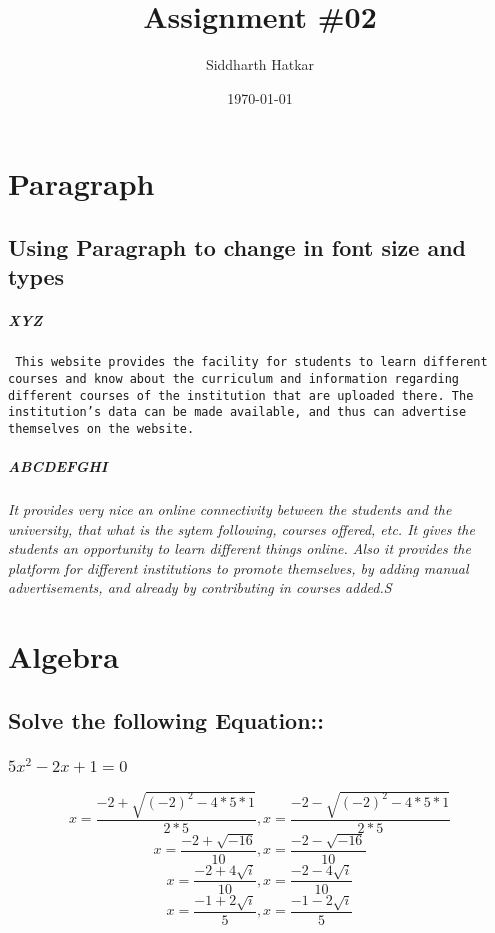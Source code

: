 \documentclass{report}
\title{Assignment \#02}
\date{\today}
\author{Siddharth Hatkar}
\begin{document}
	{\huge
	\maketitle
	}
	\newpage
	\tableofcontents
	\chapter{Paragraph}
	\section{\large{Using Paragraph to change in font size and types}}
	\paragraph{XYZ}
	\texttt{
		This website provides the facility for students to learn different courses and know about the curriculum and information regarding different courses of the institution that are uploaded there. The institution’s data can be made available, and thus can advertise themselves on the website.
	}
	\paragraph{ABCDEFGHI}
	\textit{\small
		 It provides very nice an online connectivity between the students and the university, that what is the sytem following, courses offered, etc. It gives the students an opportunity to learn different things online. Also it provides the platform for different institutions to promote themselves, by adding manual advertisements, and already by contributing in courses added.S
	}
	\newline
	\chapter{Algebra}
	\section{\large{Solve the following Equation:: }}
	\subsection{$5x^2 -2x+ 1 = 0$}
		
		$$x = \frac{-2+\sqrt{(-2)^2-4*5*1}}{2*5} , x = \frac{-2-\sqrt{(-2)^2-4*5*1}}{2*5}$$
		\newline \newline
		$$x = \frac{-2+\sqrt{-16}}{10} , x = \frac{-2-\sqrt{-16}}{10}$$
		\newline \newline
		$$x = \frac{-2+4\sqrt{i}}{10} , x = \frac{-2-4\sqrt{i}}{10}$$
		\newline \newline
		$$x = \frac{-1+2\sqrt{i}}{5} , x = \frac{-1-2\sqrt{i}}{5}$$
		\newline \newline
	
\end{document}
